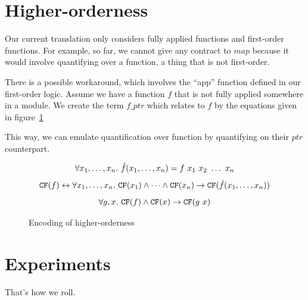 \documentclass[preprint]{sigplanconf}
\begin{document}
\section{Higher-orderness}
\label{ho}
Our current translation only considers fully applied functions and
first-order functions. For example, so far, we cannot give any
contract to $map$ because it would involve quantifying over a
function, a thing that is not first-order.

There is a possible workaround, which involves the ``app'' function
defined in our first-order logic. Assume we have a function $f$ that
is not fully applied somewhere in a module. We create the term
$f\_ptr$ which relates to $f$ by the equations given in figure~\ref{ho-fig}

This way, we can emulate quantification over function by quantifying
on their $ptr$ counterpart.


\begin{figure}
$$ \forall x_1,\dots,x_n.~\hat{f}(x_1,\dots,x_n) = f~x_1~x_2~\dots~x_n$$
$$ \texttt{CF}(f) \leftrightarrow \forall x_1,\dots,x_n.~\texttt{CF}(x_1) \land \dots \land \texttt{CF}(x_n) \to \texttt{CF}(\hat{f}(x_1,\dots,x_n))$$
$$\forall g,x.~\texttt{CF}(f) \land \texttt{CF}(x) \to \texttt{CF}(g~x)$$
\caption{Encoding of higher-orderness}
\label{ho-fig}
\end{figure}

\section{Experiments}
That's how we roll.
\end{document}
